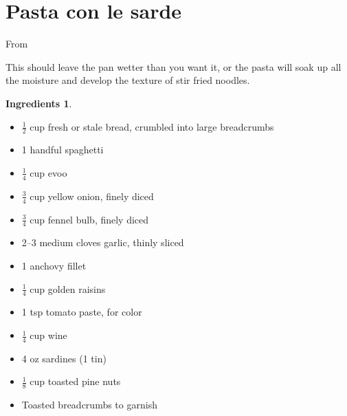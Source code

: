 \documentclass[a4paper,12pt]{scrreprt}
\theoremstyle{definition}
\newtheorem*{ingredients}{Ingredients}
\theoremstyle{plain}
\theoremstyle{remark}
\begin{document}
\section{Pasta con le sarde}
From~\cite{foodwishespastaconlesarde}

This should leave the pan wetter than you want it, or the pasta will soak up all the moisture and develop the texture of stir fried noodles.
\begin{ingredients}
  $\,$
  \begin{multicols}{2}
    \begin{itemize}
      \item $\tfrac{1}{2}$ cup fresh or stale bread, crumbled into large breadcrumbs

      \item 1 handful spaghetti

      \item $\frac{1}{4}$ cup evoo

      \item $\frac{3}{4}$ cup yellow onion, finely diced

      \item $\frac{3}{4}$ cup fennel bulb, finely diced

      \item 2--3 medium cloves garlic, thinly sliced

      \item 1 anchovy fillet

      \item $\frac{1}{4}$ cup golden raisins

      \item 1 tsp tomato paste, for color

      \item $\frac{1}{4}$ cup wine

      \item 4 oz sardines (1 tin)

      \item $\frac{1}{8}$ cup toasted pine nuts

      \item Toasted breadcrumbs to garnish
    \end{itemize}
  \end{multicols}
\end{ingredients}
\end{document}
